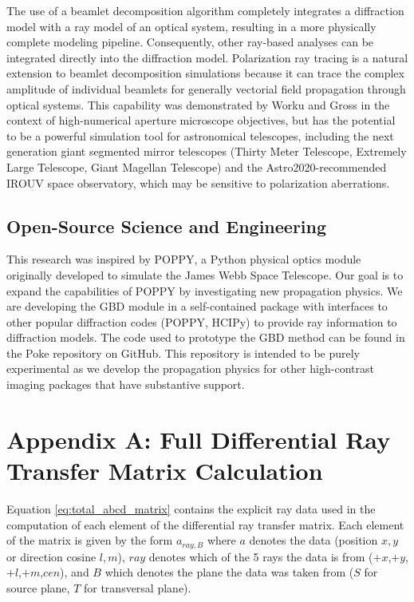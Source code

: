 The use of a beamlet decomposition algorithm completely integrates a diffraction model with a ray model of an optical system, resulting in a more physically complete  modeling pipeline. Consequently, other ray-based analyses can be integrated directly into the diffraction model. Polarization ray tracing\cite{Chippman15} is a natural extension to beamlet decomposition simulations because it can trace the complex amplitude of individual beamlets for generally vectorial field propagation through optical systems. This capability was demonstrated by Worku and Gross\cite{Worku17} in the context of high-numerical aperture microscope objectives, but has the potential to be a powerful simulation tool for astronomical telescopes, including the next generation giant segmented mirror telescopes (Thirty Meter Telescope, Extremely Large Telescope, Giant Magellan Telescope)\cite{anche_inprep} and the Astro2020-recommended IROUV space observatory, which may be sensitive to polarization aberrations.

\subsection{Open-Source Science and Engineering}
This research was inspired by POPPY, a Python physical optics module originally developed to simulate the James Webb Space Telescope. Our goal is to expand the capabilities of POPPY by investigating new propagation physics. We are developing the GBD module in a self-contained package with interfaces to other popular diffraction codes (POPPY, HCIPy) to provide ray information to diffraction models. The code used to prototype the GBD method can be found in the Poke repository on GitHub\cite{Ashcraft_poke_2022}. This repository is intended to be purely experimental as we develop the propagation physics for other high-contrast imaging packages that have substantive support. 

\section{Appendix A: Full Differential Ray Transfer Matrix Calculation}
\label{sec:appendixA}

Equation \ref{eq:total_abcd_matrix} contains the explicit ray data used in the computation of each element of the differential ray transfer matrix. Each element of the matrix is given by the form $a_{ray,B}$ where $a$ denotes the data (position $x,y$ or direction cosine $l,m$), $ray$ denotes which of the 5 rays the data is from ($+x$,$+y$,$+l$,$+m$,$cen$), and $B$ which denotes the plane the data was taken from ($S$ for source plane, $T$ for transversal plane).

